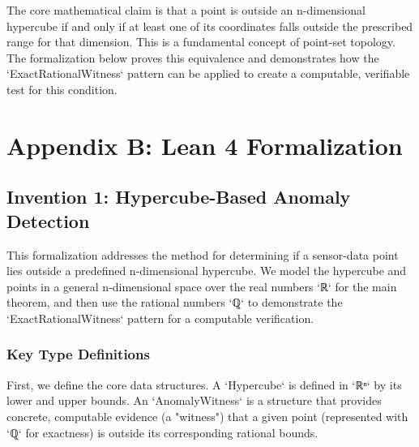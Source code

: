 \documentclass{article}
\begin{document}
The core mathematical claim is that a point is outside an n-dimensional hypercube if and only if at least one of its coordinates falls outside the prescribed range for that dimension. This is a fundamental concept of point-set topology. The formalization below proves this equivalence and demonstrates how the `ExactRationalWitness` pattern can be applied to create a computable, verifiable test for this condition.

\section{Appendix B: Lean 4 Formalization}

\subsection{Invention 1: Hypercube-Based Anomaly Detection}
This formalization addresses the method for determining if a sensor-data point lies outside a predefined n-dimensional hypercube. We model the hypercube and points in a general n-dimensional space over the real numbers `ℝ` for the main theorem, and then use the rational numbers `ℚ` to demonstrate the `ExactRationalWitness` pattern for a computable verification.

\subsubsection{Key Type Definitions}
First, we define the core data structures. A `Hypercube` is defined in `ℝⁿ` by its lower and upper bounds. An `AnomalyWitness` is a structure that provides concrete, computable evidence (a "witness") that a given point (represented with `ℚ` for exactness) is outside its corresponding rational bounds.
\end{document}
